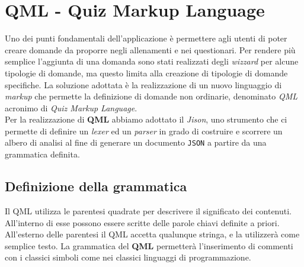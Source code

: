 \newpage
\section{QML - Quiz Markup Language}
Uno dei punti fondamentali dell'applicazione è permettere agli utenti di poter creare domande da proporre negli allenamenti e nei questionari. Per rendere più semplice l'aggiunta di una domanda sono stati realizzati degli \textit{wizzard} per alcune tipologie di domande, ma questo limita alla creazione di tipologie di domande specifiche. La soluzione adottata è la realizzazione di un nuovo linguaggio di \textit{markup} che permette la definizione di domande non ordinarie, denominato \textit{QML} acronimo di \textit{Quiz Markup Language}. \\
Per la realizzazione di \textbf{QML} abbiamo adottato il \textit{Jison}, uno strumento che ci permette di definire un \textit{lexer} ed un \textit{parser} in grado di costruire e scorrere un albero di analisi al fine di generare un documento \texttt{JSON} a partire da una grammatica definita.

\subsection{Definizione della grammatica}
Il QML utilizza le parentesi quadrate per descrivere il significato dei contenuti. All'interno di esse possono essere scritte delle parole chiavi definite a priori. All'esterno delle parentesi il QML accetta qualunque stringa, e la utilizzerà come semplice testo. La grammatica del \textbf{QML} permetterà l'inserimento di commenti con i classici simboli come nei classici linguaggi di programmazione.
